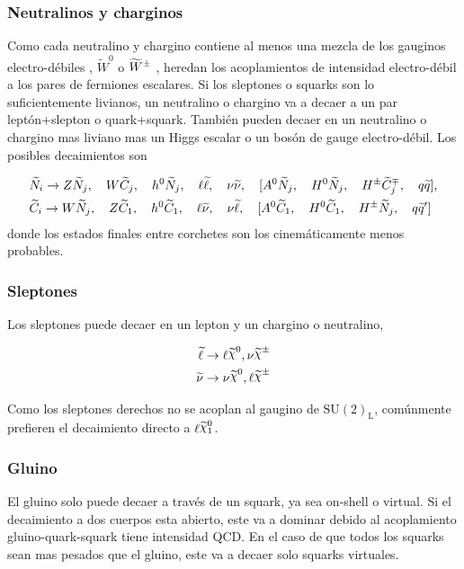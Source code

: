 \subsubsection{Neutralinos y charginos}

Como cada neutralino y chargino contiene al menos una mezcla de los
gauginos electro-débiles {\bino}, $\tilde W^0$ o $\widetilde{W}^{\pm}$ ,
heredan los acoplamientos de intensidad electro-débil a los pares de
fermiones escalares. Si los sleptones o squarks son lo suficientemente
livianos, un neutralino o chargino va a decaer a un par leptón+slepton
o quark+squark. También pueden decaer en un neutralino o chargino mas
liviano mas un Higgs escalar o un bosón de gauge electro-débil. Los
posibles decaimientos son

\begin{align*}
  &\widetilde{N}_i \rightarrow Z \widetilde{N}_j, \quad W \widetilde{C}_j, \quad h^0
  \widetilde{N}_j, \quad \ell \widetilde{\ell}, \quad \nu \widetilde{\nu}, \quad [A^0
    \widetilde{N}_j, \quad H^0 \widetilde{N}_j, \quad H^{\pm} \widetilde{C}_j^{\mp},
    \quad q \widetilde{q}], \\ &\widetilde{C}_i \rightarrow W \widetilde{N}_j, \quad Z
  \widetilde{C}_1, \quad h^0 \widetilde{C}_1, \quad \ell \widetilde{\nu}, \quad \nu
  \widetilde{\ell}, \quad [A^0 \widetilde{C}_1, \quad H^0 \widetilde{C}_1, \quad
    H^{\pm} \widetilde{N}_j, \quad q \widetilde{q}']
\end{align*}
%
donde los estados finales entre corchetes son los cinemáticamente
menos probables.

\subsubsection{Sleptones}

Los sleptones puede decaer en un lepton y un chargino o neutralino,

\begin{align}
  \slepton &\to \ell \nino, \nu\chinopm \\ \snu &\to \nu\nino,
  \ell\chinopm
\end{align}

Como los sleptones derechos no se acoplan al gaugino de $\text{SU}(2)_\text{L}$,
comúnmente prefieren el decaimiento directo a $\ell\ninoone$.

\subsubsection{Gluino}

El gluino solo puede decaer a través de un squark, ya sea on-shell o
virtual. Si el decaimiento a dos cuerpos esta abierto, este va a
dominar debido al acoplamiento gluino-quark-squark tiene intensidad
QCD. En el caso de que todos los squarks sean mas pesados que el
gluino, este va a decaer solo squarks virtuales.

